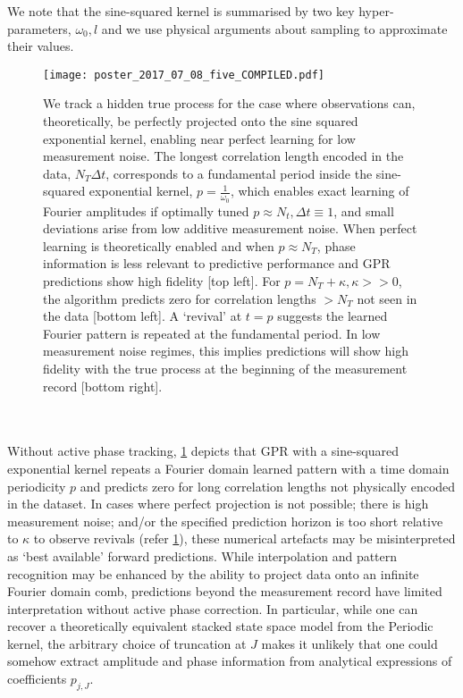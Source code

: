 We note that the sine-squared kernel is summarised by two key hyper-parameters, $\omega_0, l$ and we use physical arguments about sampling to approximate their values.
 \begin{figure} 
 	\caption{We track a hidden true process for the case where observations can, theoretically, be perfectly projected onto the sine squared exponential kernel, enabling near perfect learning for low measurement noise. The longest correlation length encoded in the data, $N_T \Delta t$, corresponds to a fundamental period inside the sine-squared exponential kernel, $p = \frac{1}{\omega_0 }$, which enables exact learning of Fourier amplitudes if optimally tuned $p \approx N_t,  \Delta t \equiv 1$, and small deviations arise from low additive measurement noise. When perfect learning is theoretically enabled and when $p \approx N_T$, phase information is less relevant to predictive performance and GPR predictions show high fidelity [top left]. For $p = N_T + \kappa, \kappa >> 0$, the algorithm predicts zero for correlation lengths $> N_T$ not seen in the data [bottom left]. A `revival'  at $t=p$ suggests the learned Fourier pattern is repeated at the fundamental period. In low measurement noise regimes, this implies predictions will show high fidelity with the true process at the beginning of the measurement record [bottom right].}
	\texttt{[image: poster\_2017\_07\_08\_five\_COMPILED.pdf]} 
	\label{fig:GPR}
\end{figure}
\\
\\
Without active phase tracking, \cref{fig:GPR} depicts that GPR with a sine-squared exponential kernel repeats a Fourier domain learned pattern with a time domain periodicity $p$ and predicts zero for long correlation lengths not physically encoded in the dataset. In cases where perfect projection is not possible; there is high measurement noise; and/or the specified prediction horizon is too short relative to $\kappa$ to observe revivals (refer \cref{fig:GPR}), these numerical artefacts may be misinterpreted as `best available' forward predictions. While interpolation and pattern recognition may be enhanced by the ability to project data onto an infinite Fourier domain comb, predictions beyond the measurement record have limited interpretation without active phase correction. In particular, while one can recover a theoretically equivalent stacked state space model from the Periodic kernel, the arbitrary choice of truncation at $J$ makes it unlikely that one could somehow extract amplitude and phase information from analytical expressions of coefficients $p_{j,J}$. 
